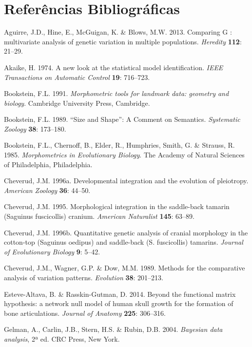 \documentclass[11pt,twoside]{report}
\begin{document}

\pagestyle{plain}

\chapter*{Referências Bibliográficas}


Aguirre, J.D., Hine, E., McGuigan, K. \& Blows, M.W. 2013. Comparing G :
multivariate analysis of genetic variation in multiple populations.
\emph{Heredity} \textbf{112}: 21--29.

Akaike, H. 1974. A new look at the statistical model identification.
\emph{IEEE Transactions on Automatic Control} \textbf{19}: 716--723.

Bookstein, F.L. 1991. \emph{Morphometric tools for landmark data:
geometry and biology}. Cambridge University Press, Cambridge.

Bookstein, F.L. 1989. ``Size and Shape'': A Comment on Semantics.
\emph{Systematic Zoology} \textbf{38}: 173--180.

Bookstein, F.L., Chernoff, B., Elder, R., Humphries, Smith, G. \&
Strauss, R. 1985. \emph{Morphometrics in Evolutionary Biology}. The
Academy of Natural Sciences of Philadelphia, Philadelphia.

Cheverud, J.M. 1996a. Developmental integration and the evolution of
pleiotropy. \emph{American Zoology} \textbf{36}: 44--50.

Cheverud, J.M. 1995. Morphological integration in the saddle-back
tamarin (Saguinus fuscicollis) cranium. \emph{American Naturalist}
\textbf{145}: 63--89.

Cheverud, J.M. 1996b. Quantitative genetic analysis of cranial
morphology in the cotton-top (Saguinus oedipus) and saddle-back (S.
fuscicollis) tamarins. \emph{Journal of Evolutionary Biology}
\textbf{9}: 5--42.

Cheverud, J.M., Wagner, G.P. \& Dow, M.M. 1989. Methods for the
comparative analysis of variation patterns. \emph{Evolution}
\textbf{38}: 201--213.

Esteve-Altava, B. \& Rasskin-Gutman, D. 2014. Beyond the functional
matrix hypothesis: a network null model of human skull growth for the
formation of bone articulations. \emph{Journal of Anatomy} \textbf{225}:
306--316.

Gelman, A., Carlin, J.B., Stern, H.S. \& Rubin, D.B. 2004.
\emph{Bayesian data analysis}, 2ª ed. CRC Press, New York.
\end{document}
